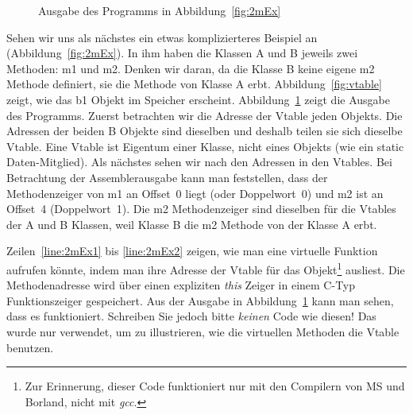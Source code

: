 \begin{figure}[tp]
\caption{Ausgabe des Programms in Abbildung~\ref{fig:2mEx} \label{fig:2mExOut}}
\end{figure}

Sehen wir uns als n\"{a}chstes ein etwas komplizierteres Beispiel an
(Abbildung~\ref{fig:2mEx}). In ihm haben die Klassen {\code A} und
{\code B} jeweils zwei Methoden: {\code m1} und {\code m2}. Denken
wir daran, da die Klasse {\code B} keine eigene {\code m2} Methode
definiert, sie die Methode von Klasse {\code A} erbt.
Abbildung~\ref{fig:vtable} zeigt, wie das {\code b1} Objekt im
Speicher erscheint. Abbildung~\ref{fig:2mExOut} zeigt die Ausgabe
des Programms. Zuerst betrachten wir die Adresse der Vtable jeden
Objekts. Die Adressen der beiden {\code B} Objekte sind dieselben
und deshalb teilen sie sich dieselbe Vtable. Eine Vtable ist
Eigentum einer Klasse, nicht eines Objekts (wie ein {\code static}
Daten-Mitglied). Als n\"{a}chstes sehen wir nach den Adressen in den
Vtables. Bei Betrachtung der Assemblerausgabe kann man feststellen,
dass der Methodenzeiger von {\code m1} an Offset~0 liegt (oder
Doppelwort~0) und {\code m2} ist an Offset~4 (Doppelwort~1). Die
{\code m2} Methodenzeiger sind dieselben f\"{u}r die Vtables der {\code
A} und {\code B} Klassen, weil Klasse {\code B} die {\code m2}
Methode von der Klasse {\code A} erbt.

Zeilen~\ref{line:2mEx1} bis \ref{line:2mEx2} zeigen, wie man eine
virtuelle Funktion aufrufen k\"{o}nnte, indem man ihre Adresse der
Vtable f\"{u}r das Objekt\footnote{Zur Erinnerung, dieser Code
funktioniert nur mit den Compilern von MS und Borland, nicht mit
\emph{gcc}.} ausliest. Die Methodenadresse wird \"{u}ber einen
expliziten \emph{this} Zeiger in einem C-Typ Funktionszeiger
gespeichert. Aus der Ausgabe in Abbildung~\ref{fig:2mExOut} kann man
sehen, dass es funktioniert. Schreiben Sie jedoch bitte
\emph{keinen} Code wie diesen! Das wurde nur verwendet, um zu
illustrieren, wie die virtuellen Methoden die Vtable benutzen.

